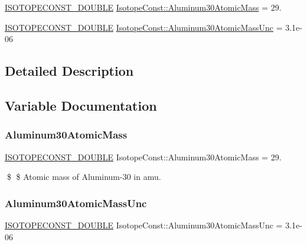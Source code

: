 \begin{DoxyCompactItemize}
\item 
\mbox{\hyperlink{group___isotope_const-_macros_ga8f45a7272ce02c0b4c65c44636ed719a}{I\+S\+O\+T\+O\+P\+E\+C\+O\+N\+S\+T\+\_\+\+D\+O\+U\+B\+LE}} \mbox{\hyperlink{group___isotope_const-_aluminum-_al30_ga65a9edc85f5fb80e783e051112a57ba0}{Isotope\+Const\+::\+Aluminum30\+Atomic\+Mass}} = 29.
\item 
\mbox{\hyperlink{group___isotope_const-_macros_ga8f45a7272ce02c0b4c65c44636ed719a}{I\+S\+O\+T\+O\+P\+E\+C\+O\+N\+S\+T\+\_\+\+D\+O\+U\+B\+LE}} \mbox{\hyperlink{group___isotope_const-_aluminum-_al30_gaf48f3bd9cc4f7b4b41cbed204a35e5bd}{Isotope\+Const\+::\+Aluminum30\+Atomic\+Mass\+Unc}} = 3.\+1e-\/06
\end{DoxyCompactItemize}


\subsection{Detailed Description}


\subsection{Variable Documentation}
\mbox{\label{group___isotope_const-_aluminum-_al30_ga65a9edc85f5fb80e783e051112a57ba0}} 
\subsubsection{\texorpdfstring{Aluminum30\+Atomic\+Mass}{Aluminum30AtomicMass}}
{\footnotesize\ttfamily \mbox{\hyperlink{group___isotope_const-_macros_ga8f45a7272ce02c0b4c65c44636ed719a}{I\+S\+O\+T\+O\+P\+E\+C\+O\+N\+S\+T\+\_\+\+D\+O\+U\+B\+LE}} Isotope\+Const\+::\+Aluminum30\+Atomic\+Mass = 29.}

\$ \$ Atomic mass of Aluminum-\/30 in amu. \mbox{\label{group___isotope_const-_aluminum-_al30_gaf48f3bd9cc4f7b4b41cbed204a35e5bd}} 
\subsubsection{\texorpdfstring{Aluminum30\+Atomic\+Mass\+Unc}{Aluminum30AtomicMassUnc}}
{\footnotesize\ttfamily \mbox{\hyperlink{group___isotope_const-_macros_ga8f45a7272ce02c0b4c65c44636ed719a}{I\+S\+O\+T\+O\+P\+E\+C\+O\+N\+S\+T\+\_\+\+D\+O\+U\+B\+LE}} Isotope\+Const\+::\+Aluminum30\+Atomic\+Mass\+Unc = 3.\+1e-\/06}

